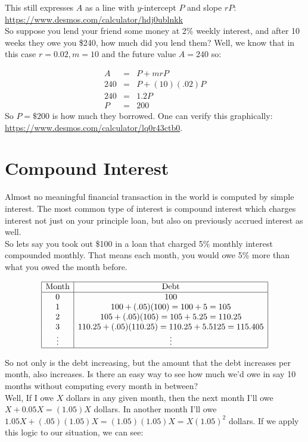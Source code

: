 \documentclass[10pt]{article}
\theoremstyle{definition}
\begin{document}
This still expresses $A$ as a line with $y$-intercept $P$ and slope $rP$: \url{https://www.desmos.com/calculator/hdj0ublnkk}\\

So suppose you lend your friend some money at 2\% weekly interest, and after 10 weeks they owe you \$240, how much did you lend them?  Well, we know that in this case $r=0.02, m=10$ and the future value $A=240$ so:

\begin{eqnarray*}
A&=&P+mrP\\
240&=&P+(10)(.02)P\\
240&=&1.2P\\
P&=&200
\end{eqnarray*}
 So $P=\$200$ is how much they borrowed.  One can verify this graphically: \url{https://www.desmos.com/calculator/lq0r43ctb0}.
 
 
 \section{Compound Interest}

Almost no meaningful financial transaction in the world is computed by simple interest.  The most common type of interest is compound interest which charges interest not just on your principle loan, but also on previously accrued interest as well.\\

So lets say you took out \$100 in a loan that charged 5\% monthly interest compounded monthly.  That means each month, you would owe 5\% more than what you owed the month before.


$$\begin{array}{|c|c|}
\hline
\text{Month} & \text{Debt}\\
\hline
0 & 100\\
1& 100+(.05)(100)=100+5=105\\
2& 105+(.05)(105)=105+5.25=110.25\\
3 & 110.25+(.05)(110.25)=110.25+5.5125=115.405\\
\vdots & \vdots\\
\hline
\end{array}$$

So not only is the debt increasing, but the amount that the debt increases per month, also increases.  Is there an easy way to see how much we'd owe in say 10 months without computing every month in between?\\

Well, If I owe $X$ dollars in any given month, then the next month I'll owe $X+0.05X=(1.05)X$ dollars.  In another month I'll owe $1.05X+(.05)(1.05)X=(1.05)(1.05)X=X(1.05)^2$ dollars.  If we apply this logic to our situation, we can see:
\end{document}
